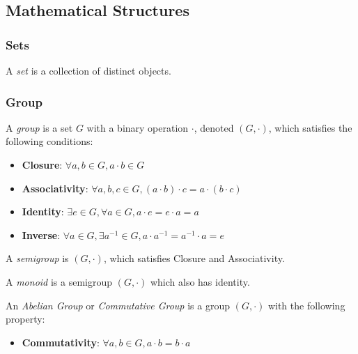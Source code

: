 \documentclass{article}
\begin{document}
    \subsection{Mathematical Structures}
    \subsubsection{Sets}
    \begin{defn}[Set]
    	A \emph{set} is a collection of distinct objects. 
    \end{defn}
    \subsubsection{Group}
    \begin{defn}[Group]
    	A \emph{group} is a set $G$ with a binary operation $\cdot$, denoted $(G,\cdot)$, which satisfies the following conditions:
    	\begin{itemize}
    		\item \textbf{Closure}: $\forall a,b \in G, a \cdot b \in G$
    		\item \textbf{Associativity}: $\forall a,b,c \in G, (a \cdot b) \cdot c=a \cdot (b \cdot c)$
    		\item \textbf{Identity}: $\exists e \in G, \forall a \in G, a \cdot e=e \cdot a=a$
    		\item \textbf{Inverse}: $\forall a \in G, \exists a^{-1} \in G, a \cdot a^{-1}=a^{-1} \cdot a=e$
    	\end{itemize}
    \end{defn}
	\begin{defn}[Semigroup]
		A \emph{semigroup} is $(G,\cdot)$, which satisfies Closure and Associativity.
	\end{defn}
	\begin{defn}[Monoid]
		A \emph{monoid} is a semigroup $(G,\cdot)$ which also has identity.
	\end{defn}
	\begin{defn}
		An \emph{Abelian Group} or \emph{Commutative Group} is a group $(G,\cdot)$ with the following property:
		\begin{itemize}
			\item \textbf{Commutativity}: $\forall a,b \in G, a \cdot b=b \cdot a$
		\end{itemize}
	\end{defn}
\end{document}
